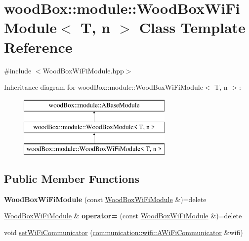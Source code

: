 \hypertarget{classwood_box_1_1module_1_1_wood_box_wi_fi_module}{}\section{wood\+Box\+:\+:module\+:\+:Wood\+Box\+Wi\+Fi\+Module$<$ T, n $>$ Class Template Reference}
\label{classwood_box_1_1module_1_1_wood_box_wi_fi_module}


{\ttfamily \#include $<$Wood\+Box\+Wi\+Fi\+Module.\+hpp$>$}

Inheritance diagram for wood\+Box\+:\+:module\+:\+:Wood\+Box\+Wi\+Fi\+Module$<$ T, n $>$\+:\begin{figure}[H]
\begin{center}
\leavevmode
\includegraphics[height=3.000000cm]{classwood_box_1_1module_1_1_wood_box_wi_fi_module}
\end{center}
\end{figure}
\subsection*{Public Member Functions}
\begin{DoxyCompactItemize}
\item 
\mbox{\label{classwood_box_1_1module_1_1_wood_box_wi_fi_module_aac99d548520fa9c5f5a29aa99bdc241d}} 
{\bfseries Wood\+Box\+Wi\+Fi\+Module} (const \mbox{\hyperlink{classwood_box_1_1module_1_1_wood_box_wi_fi_module}{Wood\+Box\+Wi\+Fi\+Module}} \&)=delete
\item 
\mbox{\label{classwood_box_1_1module_1_1_wood_box_wi_fi_module_aba3f7e5c892542d70db28130eddb3084}} 
\mbox{\hyperlink{classwood_box_1_1module_1_1_wood_box_wi_fi_module}{Wood\+Box\+Wi\+Fi\+Module}} \& {\bfseries operator=} (const \mbox{\hyperlink{classwood_box_1_1module_1_1_wood_box_wi_fi_module}{Wood\+Box\+Wi\+Fi\+Module}} \&)=delete
\item 
void \mbox{\hyperlink{classwood_box_1_1module_1_1_wood_box_wi_fi_module_ad1fa85749c0e194c9e589261dfb2433d}{set\+Wi\+Fi\+Communicator}} (\mbox{\hyperlink{classwood_box_1_1communication_1_1wifi_1_1_a_wi_fi_communicator}{communication\+::wifi\+::\+A\+Wi\+Fi\+Communicator}} \&wifi)
\end{DoxyCompactItemize}
